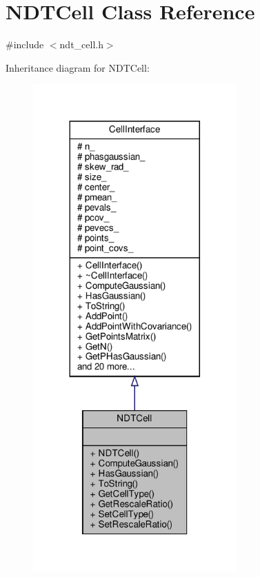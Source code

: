 \hypertarget{classNDTCell}{}\section{N\+D\+T\+Cell Class Reference}
\label{classNDTCell}


{\ttfamily \#include $<$ndt\+\_\+cell.\+h$>$}



Inheritance diagram for N\+D\+T\+Cell\+:\nopagebreak
\begin{figure}[H]
\begin{center}
\leavevmode
\includegraphics[width=221pt]{dc/d19/classNDTCell__inherit__graph}
\end{center}
\end{figure}


